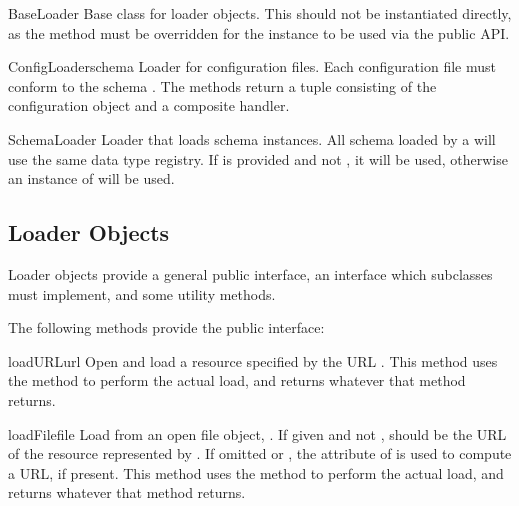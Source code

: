 \documentclass{howto}
\begin{document}
\begin{classdesc}{BaseLoader}{}
  Base class for loader objects.  This should not be instantiated
  directly, as the  method must be overridden
  for the instance to be used via the public API.
\end{classdesc}

\begin{classdesc}{ConfigLoader}{schema}
  Loader for configuration files.  Each configuration file must
  conform to the schema .  The  methods
  return a tuple consisting of the configuration object and a
  composite handler.
\end{classdesc}

\begin{classdesc}{SchemaLoader}{}
  Loader that loads schema instances.  All schema loaded by a
   will use the same data type registry.  If
   is provided and not , it will be used,
  otherwise an instance of  will be
  used.
\end{classdesc}


\subsection{Loader Objects}

Loader objects provide a general public interface, an interface which
subclasses must implement, and some utility methods.

The following methods provide the public interface:

\begin{methoddesc}[loader]{loadURL}{url}
  Open and load a resource specified by the URL .
  This method uses the  method to perform the
  actual load, and returns whatever that method returns.
\end{methoddesc}

\begin{methoddesc}[loader]{loadFile}{file}
  Load from an open file object, .  If given and not
  ,  should be the URL of the resource represented
  by .  If omitted or , the 
  attribute of  is used to compute a  URL, if
  present.
  This method uses the  method to perform the
  actual load, and returns whatever that method returns.
\end{methoddesc}
\end{document}

